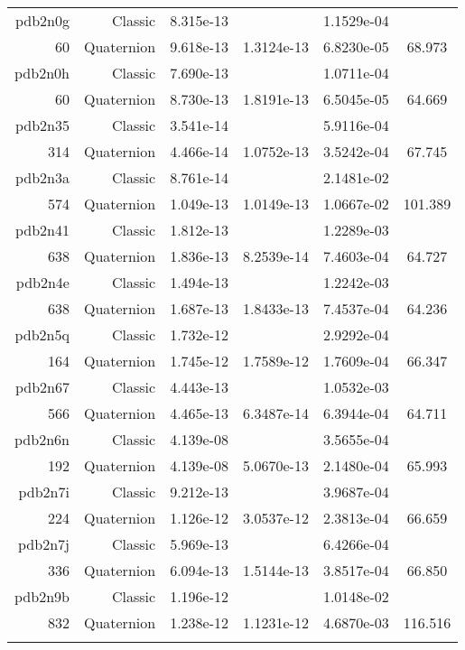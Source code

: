 \begin{xltabular}{\textwidth}{r|rS[table-format=1.3e+2]S[table-format=1.4e+2]S[table-format=1.4e+2]S[table-format=-1.3]}
pdb2n0g & Classic & 8.315e-13 &  & 1.1529e-04 & \\
60 & Quaternion & 9.618e-13 & 1.3124e-13 & 6.8230e-05 & 68.973\\  \addlinespace
pdb2n0h & Classic & 7.690e-13 &  & 1.0711e-04 & \\
60 & Quaternion & 8.730e-13 & 1.8191e-13 & 6.5045e-05 & 64.669\\  \addlinespace
pdb2n35 & Classic & 3.541e-14 &  & 5.9116e-04 & \\
314 & Quaternion & 4.466e-14 & 1.0752e-13 & 3.5242e-04 & 67.745\\  \addlinespace
pdb2n3a & Classic & 8.761e-14 &  & 2.1481e-02 & \\
574 & Quaternion & 1.049e-13 & 1.0149e-13 & 1.0667e-02 & 101.389\\  \addlinespace
pdb2n41 & Classic & 1.812e-13 &  & 1.2289e-03 & \\
638 & Quaternion & 1.836e-13 & 8.2539e-14 & 7.4603e-04 & 64.727\\  \addlinespace
pdb2n4e & Classic & 1.494e-13 &  & 1.2242e-03 & \\
638 & Quaternion & 1.687e-13 & 1.8433e-13 & 7.4537e-04 & 64.236\\  \addlinespace
pdb2n5q & Classic & 1.732e-12 &  & 2.9292e-04 & \\
164 & Quaternion & 1.745e-12 & 1.7589e-12 & 1.7609e-04 & 66.347\\  \addlinespace
pdb2n67 & Classic & 4.443e-13 &  & 1.0532e-03 & \\
566 & Quaternion & 4.465e-13 & 6.3487e-14 & 6.3944e-04 & 64.711\\  \addlinespace
pdb2n6n & Classic & 4.139e-08 &  & 3.5655e-04 & \\
192 & Quaternion & 4.139e-08 & 5.0670e-13 & 2.1480e-04 & 65.993\\  \addlinespace
pdb2n7i & Classic & 9.212e-13 &  & 3.9687e-04 & \\
224 & Quaternion & 1.126e-12 & 3.0537e-12 & 2.3813e-04 & 66.659\\  \addlinespace
pdb2n7j & Classic & 5.969e-13 &  & 6.4266e-04 & \\
336 & Quaternion & 6.094e-13 & 1.5144e-13 & 3.8517e-04 & 66.850\\  \addlinespace
pdb2n9b & Classic & 1.196e-12 &  & 1.0148e-02 & \\
832 & Quaternion & 1.238e-12 & 1.1231e-12 & 4.6870e-03 & 116.516\\  \addlinespace

\end{xltabular}
